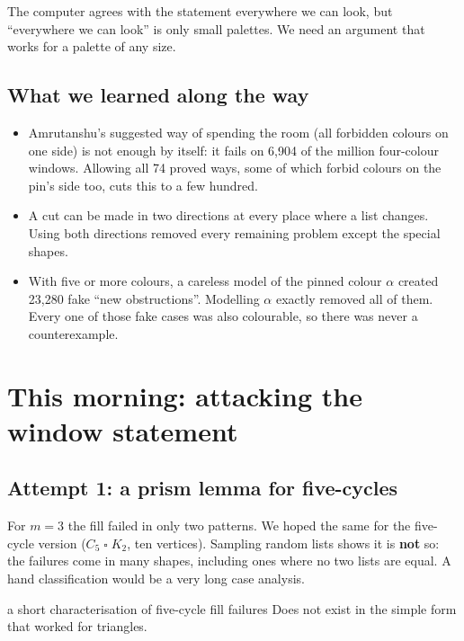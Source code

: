 \documentclass[11pt,oneside,openany]{book}
\newcommand{\T}{\mathbin{\square}}
\begin{document}
\begin{plainwords}
The computer agrees with the statement everywhere we can look, but ``everywhere we can look'' is
only small palettes. We need an argument that works for a palette of any size.
\end{plainwords}

\section{What we learned along the way}

\begin{itemize}[itemsep=0.3em]
\item Amrutanshu's suggested way of spending the room (all forbidden colours on one side) is not
enough by itself: it fails on 6,904 of the million four-colour windows. Allowing all 74 proved
ways, some of which forbid colours on the pin's side too, cuts this to a few hundred.
\item A cut can be made in two directions at every place where a list changes. Using both
directions removed every remaining problem except the special shapes.
\item With five or more colours, a careless model of the pinned colour $\alpha$ created 23,280
fake ``new obstructions''. Modelling $\alpha$ exactly removed all of them. Every one of those fake
cases was also colourable, so there was never a counterexample.
\end{itemize}

\chapter{This morning: attacking the window statement}

\section{Attempt 1: a prism lemma for five-cycles}

For $m=3$ the fill failed in only two patterns. We hoped the same for the five-cycle version
($C_5 \T K_2$, ten vertices). Sampling random lists shows it is \textbf{not} so: the failures
come in many shapes, including ones where no two lists are equal. A hand classification would be
a very long case analysis.

\begin{openitem}{a short characterisation of five-cycle fill failures}
Does not exist in the simple form that worked for triangles.
\end{openitem}
\end{document}
